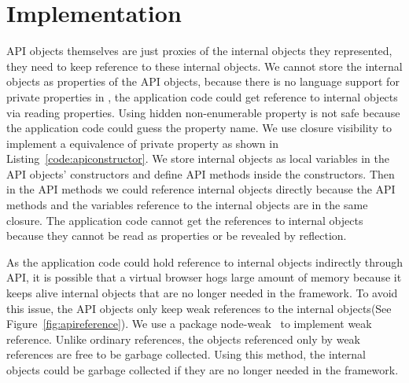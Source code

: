 \section{Implementation}
API objects themselves are just proxies of the internal objects they represented,
they need to keep reference to these internal objects.
We cannot store the internal objects as properties of the API objects,
because there is no language support for private properties in \js,
the application code could get reference to internal objects
via reading properties.
Using hidden non-enumerable property is not safe because the application
code could guess the property name.
We use closure visibility to implement a equivalence of private property as
shown in Listing~\ref{code:apiconstructor}.
We store internal objects as local variables in the API objects' constructors
and define API methods inside the constructors.
Then in the API methods we could reference internal objects directly 
because the API methods
and the variables reference to the internal objects are in the same closure.
The application code cannot get the references to internal objects because
they cannot be read as properties or be revealed by reflection.




As the application code could hold reference to internal objects indirectly
through API,
it is possible that a virtual browser hogs large amount of memory
because it keeps alive internal objects that are no longer needed in
the framework.
To avoid this issue, the API objects only keep weak references to the
internal objects(See Figure~\ref{fig:apireference}).
We use a \nodejs{} package node-weak~\cite{nodeweak} to implement weak reference.
Unlike ordinary references, the objects referenced only by weak references are
free to be garbage collected.
Using this method, 
the internal objects could be garbage collected if they are no longer needed in
the framework.


\apireferencefig{}

